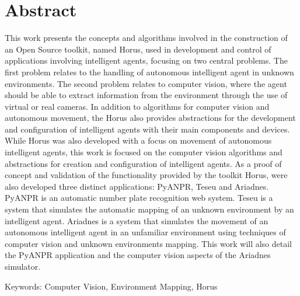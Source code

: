

\chapter*{Abstract}
This work presents the concepts and algorithms involved in the construction of an Open Source toolkit, named Horus, used in development and control of applications involving intelligent agents, focusing on two central problems. The first problem relates to the handling of autonomous intelligent agent in unknown environments. The second problem relates to computer vision, where the agent should be able to extract information from the environment through the use of virtual or real cameras. In addition to algorithms for computer vision and autonomous movement, the Horus also provides abstractions for the development and configuration of intelligent agents with their main components and devices. While Horus was also developed with a focus on movement of autonomous intelligent agents, this work is focused on the computer vision algorithms and abstractions for creation and configuration of intelligent agents. As a proof of concept and validation of the functionality provided by the toolkit Horus, were also developed three distinct applications: PyANPR, Teseu and Ariadnes. PyANPR is an automatic number plate recognition web system. Teseu is a system that simulates the automatic mapping of an unknown environment by an intelligent agent. Ariadnes is a system that simulates the movement of an autonomous intelligent agent in an unfamiliar environment using techniques of computer vision and unknown environments mapping. This work will also detail the PyANPR application and the computer vision aspects of the Ariadnes simulator.


\vspace{0.5cm}

Keywords: Computer Vision, Environment Mapping, Horus


